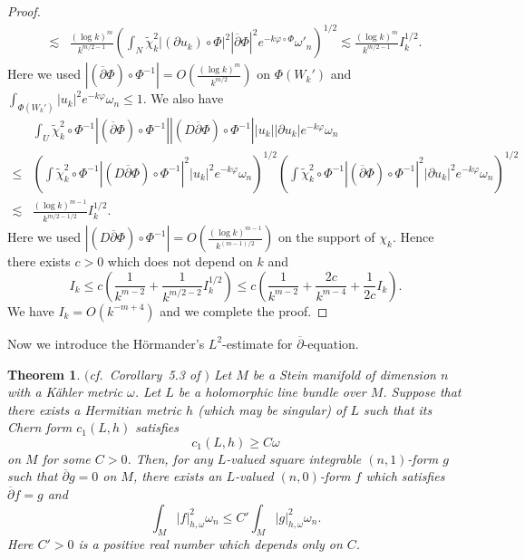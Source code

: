 \documentclass[12pt,oneside]{amsart}
\theoremstyle{plain}
\newtheorem{theorem}{Theorem}
\theoremstyle{definition}
\theoremstyle{remark}
\begin{document}
\begin{proof}
\begin{align*}
\lesssim & 
\frac{(\log k)^{m}}{k^{m/2-1}}
\left(\int_{N} \tilde{\chi}^2_{k} |(\partial u_{k})\circ \Phi|^2 |\overline{\partial} \Phi|^2 e^{-k \varphi\circ \Phi} \omega'_{n} \right)^{1/2} 
\lesssim 
\frac{(\log k)^{m}}{k^{m/2-1}} I_{k}^{1/2}.  
\end{align*}
Here we used $|(\overline{\partial} \Phi) \circ \Phi^{-1}| = O(\frac{(\log k)^m}{k^{m/2}})$ on $\Phi(W_k')$ and $\int_{\Phi(W_k')} |u_k|^2e^{-k\varphi} \omega_n \leq 1$.  
We also have 
\begin{align*}
& \int_{U} \tilde{\chi}^2_{k}\circ \Phi^{-1} |(\overline{\partial} \Phi)\circ \Phi^{-1}| |(D \overline{\partial} \Phi) \circ \Phi^{-1}| |u_{k}| |\partial u_{k}|e^{-k \varphi}\omega_{n} \\
\leq & 
\left(\int \tilde{\chi}^2_{k}\circ \Phi^{-1} |(D\overline{\partial} \Phi) \circ \Phi^{-1}|^2 |u_{k}|^2 e^{-k\varphi}\omega_{n} \right)^{1/2}
\left(\int \tilde{\chi}^2_{k} \circ\Phi^{-1} |(\overline{\partial} \Phi) \circ \Phi^{-1}|^2 |\partial u_{k}|^2 e^{-k\varphi}\omega_{n} \right)^{1/2} \\
\lesssim & 
\frac{(\log k)^{m-1}}{k^{m/2-1/2}} I_{k}^{1/2}.
\end{align*}
Here we used $|(D\overline{\partial} \Phi) \circ \Phi^{-1}| = O(\frac{(\log k)^{m-1}}{k^{(m-1)/2}})$ on the support of $\chi_k$.  
Hence there exists $c > 0$ which does not depend on $k$ and 
\[
I_{k} \leq c \left( \frac{1}{k^{m-2}} + \frac{1}{k^{m/2-2}} I_{k}^{1/2} \right) 
\leq 
c \left(\frac{1}{k^{m-2}} + \frac{2c}{k^{m-4}} + \frac{1}{2c}I_{k} \right).  
\]
We have $I_{k} = O(k^{-m+4})$ and we complete the proof.  
\end{proof}
Now we introduce the H\"ormander's $L^2$-estimate for $\overline{\partial}$-equation.  
\begin{theorem}{$($cf.~Corollary~5.3 of \cite{Dem2}}\label{theorem:4}$)$
Let $M$ be a Stein manifold of dimension $n$ with a K\"ahler metric $\omega$.   
Let $L$ be a holomorphic line bundle over $M$.  
Suppose that there exists a Hermitian metric $h$ (which may be singular) of $L$ such that its Chern form $c_{1}(L, h)$ 
satisfies 
\begin{equation}\label{inequality:1}
c_{1}(L, h) \geq C \omega
\end{equation}
on $M$ for some $C>0$.  
Then, for any $L$-valued square integrable $(n, 1)$-form $g$ such that $\overline{\partial} g = 0$ on $M$, there exists an $L$-valued $(n, 0)$-form $f$ which satisfies $\overline{\partial} f = g$ and 
\[
\int_{M} |f|^2_{h, \omega} \omega_{n} \leq  C' \int_{M} |g|^2_{h, \omega} \omega_n.  
\]
%
Here $C' > 0$ is a positive real number which depends only on $C$.  
\end{theorem}
\end{document}
